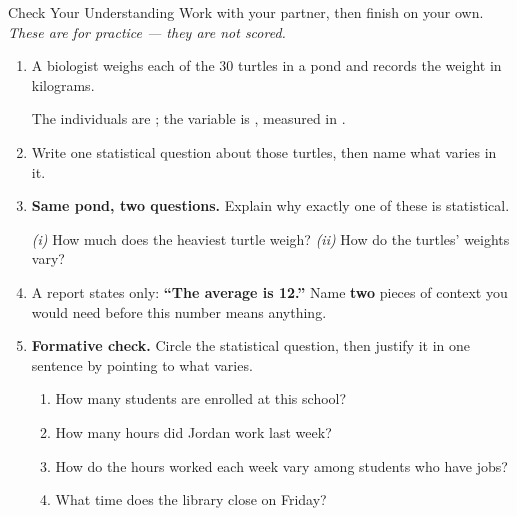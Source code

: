 \boxguard[14]
\begin{notesbox}{Check Your Understanding}
Work with your partner, then finish on your own. \emph{These are for practice --- they are not
scored.}
\begin{enumerate}[leftmargin=1.9em, itemsep=9pt]
  \item A biologist weighs each of the 30 turtles in a pond and records the weight in kilograms.

        The individuals are \blank{5.4cm}; the variable is \blank{3.6cm},
        measured in \blank{3.0cm}.
  \item Write one statistical question about those turtles, then name what varies in it.
        \answerspace{1.8cm}{}
  \item \textbf{Same pond, two questions.} Explain why exactly one of these is statistical.

        \emph{(i)} How much does the heaviest turtle weigh? \quad
        \emph{(ii)} How do the turtles' weights vary?
        \answerspace{2.0cm}{}
  \item A report states only: \textbf{``The average is 12.''} Name \textbf{two} pieces of
        context you would need before this number means anything.
        \answerspace{1.8cm}{}
  \item \textbf{Formative check.} Circle the statistical question, then justify it in one
        sentence by pointing to what varies.
        \begin{enumerate}[label=\textbf{(\Alph*)}, leftmargin=2.2em, itemsep=4pt]
          \item How many students are enrolled at this school?
          \item How many hours did Jordan work last week?
          \item How do the hours worked each week vary among students who have jobs?
          \item What time does the library close on Friday?
        \end{enumerate}
        \answerspace{1.6cm}{}
\end{enumerate}
\end{notesbox}


